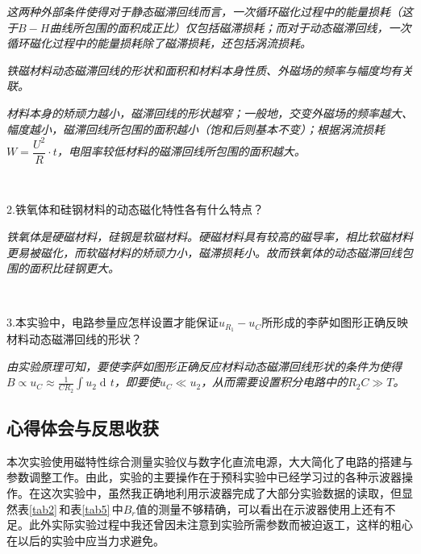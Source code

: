 \documentclass[UTF-8,twoside,cs4size]{ctexart}
\DeclareMathOperator\dif{d\!}
\begin{document}
	\textit{这两种外部条件使得对于静态磁滞回线而言，一次循环磁化过程中的能量损耗（这于$ B-H $曲线所包围的面积成正比）仅包括磁滞损耗；而对于动态磁滞回线，一次循环磁化过程中的能量损耗除了磁滞损耗，还包括涡流损耗。}
	
	\textit{铁磁材料动态磁滞回线的形状和面积和材料本身性质、外磁场的频率与幅度均有关联。}
	
	\textit{材料本身的矫顽力越小，磁滞回线的形状越窄；一般地，交变外磁场的频率越大、幅度越小，磁滞回线所包围的面积越小（饱和后则基本不变）；根据涡流损耗$ W=\dfrac{U^2}{R}\cdot t $，电阻率较低材料的磁滞回线所包围的面积越大。}
	
	~\
	
	\noindent 2.铁氧体和硅钢材料的动态磁化特性各有什么特点？
	
	\textit{铁氧体是硬磁材料，硅钢是软磁材料。硬磁材料具有较高的磁导率，相比软磁材料更易被磁化，而软磁材料的矫顽力小，磁滞损耗小。故而铁氧体的动态磁滞回线包围的面积比硅钢更大。}
	
	~\
	
	\noindent 3.本实验中，电路参量应怎样设置才能保证$ u_{R_1}-u_C $所形成的李萨如图形正确反映材料动态磁滞回线的形状？
	
	\textit{由实验原理可知，要使李萨如图形正确反应材料动态磁滞回线形状的条件为使得$\displaystyle B\propto u_C\approx\frac{1}{CR_2}\int u_2\dif t $，即要使$ u_C\ll u_2 $，从而需要设置积分电路中的$ R_2C\gg T $。}
	\subsection{心得体会与反思收获}
	本次实验使用磁特性综合测量实验仪与数字化直流电源，大大简化了电路的搭建与参数调整工作。由此，实验的主要操作在于预科实验中已经学习过的各种示波器操作。在这次实验中，虽然我正确地利用示波器完成了大部分实验数据的读取，但显然表\ref{tab2}\,和表\ref{tab5}\,中$ B_r $值的测量不够精确，可以看出在示波器使用上还有不足。此外实际实验过程中我还曾因未注意到实验所需参数而被迫返工，这样的粗心在以后的实验中应当力求避免。
\end{document}
